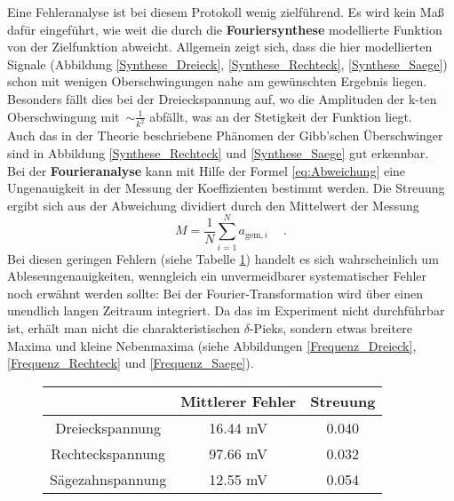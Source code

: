 Eine Fehleranalyse ist bei diesem Protokoll wenig zielführend. Es wird kein Maß dafür eingeführt, wie weit die durch die \textbf{Fouriersynthese} modellierte Funktion von der Zielfunktion abweicht. Allgemein zeigt sich, dass die hier modellierten Signale (Abbildung \ref{Synthese_Dreieck}, \ref{Synthese_Rechteck}, \ref{Synthese_Saege}) schon mit wenigen Oberschwingungen nahe am gewünschten Ergebnis liegen. Besonders fällt dies bei der Dreieckspannung auf, wo die Amplituden der k-ten Oberschwingung mit~$\sim \frac{1}{k^2}$ abfällt, was an der Stetigkeit der Funktion liegt. \\
Auch das in der Theorie beschriebene Phänomen der Gibb'schen Überschwinger sind in Abbildung \ref{Synthese_Rechteck} und \ref{Synthese_Saege} gut erkennbar. \\
Bei der \textbf{Fourieranalyse} kann mit Hilfe der Formel \eqref{eq:Abweichung} eine Ungenauigkeit in der Messung der Koeffizienten bestimmt werden. Die Streuung ergibt sich aus der Abweichung dividiert durch den Mittelwert der Messung
\begin{equation}
M = \frac{1}{N}  \sum_{i=1}^{N}  a_{\text{gem},i}\ \quad.
\end{equation} 
Bei diesen geringen Fehlern (siehe Tabelle \ref{tab:Fehler}) handelt es sich wahrscheinlich um Ableseungenauigkeiten, wenngleich ein unvermeidbarer systematischer Fehler noch erwähnt werden sollte: Bei der Fourier-Transformation wird über einen unendlich langen Zeitraum integriert. Da das im Experiment nicht durchführbar ist, erhält man nicht die charakteristischen $\delta$-Pieks, sondern etwas breitere Maxima und kleine Nebenmaxima (siehe Abbildungen \ref{Frequenz_Dreieck}, \ref{Frequenz_Rechteck} und \ref{Frequenz_Saege}).
\begin{figure}[h!]
	\centering
		\begin{tabular}{c|cc}
			 & Mittlerer Fehler & Streuung \\
			 \hline
			Dreieckspannung & 16.44 \si{\milli\volt} & 0.040 \\
			Rechteckspannung & 97.66 \si{\milli\volt} & 0.032 \\
			Sägezahnspannung & 12.55 \si{\milli\volt} & 0.054 \\
		\end{tabular}
		\label{tab:Fehler}
\end{figure}


